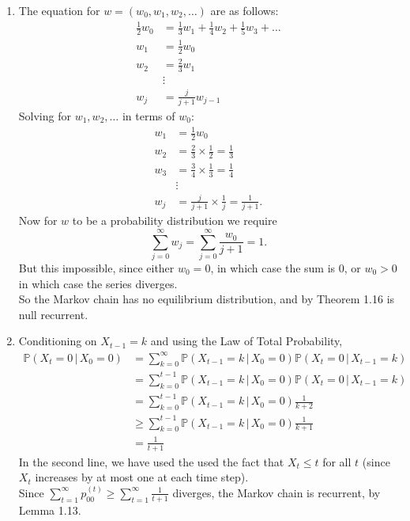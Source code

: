 \documentclass[11pt,a4paper]{article}
\begin{document}
\begin{enumerate}
        \item The equation for $w = (w_0, w_1, w_2, \ldots)$ are as follows:
        \begin{align*}
            \frac{1}{2}w_0 &= \frac{1}{3}w_1+\frac{1}{4}w_2+\frac{1}{5}w_3+\ldots\\
            w_1 &= \frac{1}{2}w_0\\
            w_2 &= \frac{2}{3}w_1\\
            &\vdots\\
            w_j &= \frac{j}{j+1}w_{j-1}
        \end{align*}
        Solving for $w_1, w_2,\ldots$ in terms of $w_0$:
        \begin{align*}
            w_1 &= \frac{1}{2}w_0\\
            w_2 &= \frac{2}{3} \times \frac{1}{2} = \frac{1}{3}\\
            w_3 &= \frac{3}{4} \times \frac{1}{3} = \frac{1}{4}\\
            & \vdots \\
            w_j &= \frac{j}{j+1}\times \frac{1}{j} = \frac{1}{j+1}.
        \end{align*}
        Now for $w$ to be a probability distribution we require
        $$
        \sum_{j=0}^\infty w_j = \sum_{j=0}^\infty \frac{w_0}{j+1} = 1.
        $$
        But this impossible, since either $w_0 = 0$, in which case the sum is 0, or $w_0>0$ in which case the series diverges.\\
        So the Markov chain has no equilibrium distribution, and by Theorem 1.16 is null recurrent.
        \item Conditioning on $X_{t-1} = k$ and using the Law of Total Probability,
        \begin{align*}
            \mathbb{P}(X_t = 0\, | \, X_0 = 0)
            &= \sum_{k=0}^\infty \mathbb{P}(X_{t-1}=k\, | \, X_0=0)\mathbb{P}(X_t=0\, | \, X_{t-1}=k)\\
            &= \sum_{k=0}^{t-1} \mathbb{P}(X_{t-1}=k\, | \, X_0=0)\mathbb{P}(X_t=0\, | \, X_{t-1}=k)\\
            &= \sum_{k=0}^{t-1} \mathbb{P}(X_{t-1}=k\, | \, X_0=0)\frac{1}{k+2}\\
            & \geq \sum_{k=0}^{t-1} \mathbb{P}(X_{t-1}=k\, | \, X_0=0)\frac{1}{k+1}\\
            &= \frac{1}{t+1}
        \end{align*}
        In the second line, we have used the used the fact that $X_t \leq t$ for all $t$ (since $X_t$ increases by at most one at each time step).\\
        Since $\sum_{t=1}^\infty p_{00}^{(t)} \geq \sum_{t=1}^\infty \frac{1}{t+1}$ diverges, the Markov chain is recurrent, by Lemma 1.13.
    \end{enumerate}
\end{document}
